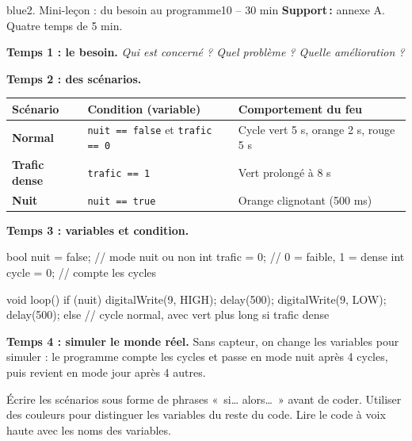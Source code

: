 \documentclass[11pt,a4paper]{article}
\begin{document}
\begin{etape}{blue}{2. Mini-leçon : du besoin au programme}{10 -- 30 min}
\textbf{Support\,:} annexe A. Quatre temps de 5 min.

\textbf{Temps 1 : le besoin.} \emph{Qui est concerné ? Quel problème ? Quelle amélioration ?}

\textbf{Temps 2 : des scénarios.}
\begin{center}
\begin{tabularx}{\linewidth}{>{\bfseries}p{2.8cm}Y Y}
\toprule
Scénario & Condition (variable) & Comportement du feu\\
\midrule
Normal & \texttt{nuit == false} et \texttt{trafic == 0} & Cycle vert 5 s, orange 2 s, rouge 5 s\\
Trafic dense & \texttt{trafic == 1} & Vert prolongé à 8 s\\
Nuit & \texttt{nuit == true} & Orange clignotant (500 ms)\\
\bottomrule
\end{tabularx}
\end{center}

\textbf{Temps 3 : variables et condition.}
\begin{arduino}
bool nuit = false;      // mode nuit ou non
int trafic = 0;         // 0 = faible, 1 = dense
int cycle = 0;          // compte les cycles

void loop() {
  if (nuit) {
    digitalWrite(9, HIGH); delay(500);
    digitalWrite(9, LOW);  delay(500);
  } else {
    // cycle normal, avec vert plus long si trafic dense
  }
}
\end{arduino}

\textbf{Temps 4 : simuler le monde réel.} Sans capteur, on change les variables pour simuler : le programme compte les cycles et passe en mode nuit après 4 cycles, puis revient en mode jour après 4 autres.

\begin{astuce}
Écrire les scénarios sous forme de phrases «~si\ldots{} alors\ldots~» avant de coder. Utiliser des couleurs pour distinguer les variables du reste du code. Lire le code à voix haute avec les noms des variables.
\end{astuce}
\end{etape}
\end{document}
